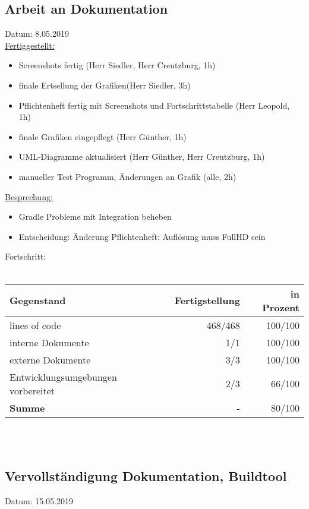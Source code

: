 \documentclass[12pt]{article}
\begin{document}
\newpage

\newpage
\subsection{Arbeit an Dokumentation}
Datum: 8.05.2019 \\

\uline{Fertiggestellt:}
\begin{itemize}\itemsep0em
\item Screenshots fertig (Herr Siedler, Herr Creutzburg, 1h)
\item finale Ertsellung der Grafiken(Herr Siedler, 3h)
\item Pflichtenheft fertig mit Screenshots und Fortschrittstabelle (Herr Leopold, 1h)
\item finale Grafiken eingepflegt (Herr Günther, 1h)
\item UML-Diagramme aktualisiert (Herr Günther, Herr Creutzburg, 1h)
\item  manueller Test Programm, Änderungen an Grafik (alle, 2h)\\
\end{itemize}

\uline{Besprechung:}
\begin{itemize}\itemsep0em
\item Gradle Probleme mit Integration beheben
\item Entscheidung: Änderung Pflichtenheft: Auflösung muss FullHD sein
\end{itemize}

Fortschritt:\\\\
\begin{tabularx}{\textwidth}{|X|r|r|} \hline
\textbf{Gegenstand}&\textbf{Fertigstellung} & \textbf{in Prozent}\\ \hline
lines of code & 468/468  & 100/100\\ \hline
interne Dokumente & 1/1 & 100/100  \\ \hline
externe Dokumente & 3/3 & 100/100 \\ \hline
Entwicklungsumgebungen vorbereitet & 2/3 & 66/100 \\ \hline
\textbf{Summe} & - & 80/100  \\ \hline
\end{tabularx}\\\\


\newpage
\subsection{Vervollständigung Dokumentation, Buildtool}
Datum: 15.05.2019 \\
\end{document}
